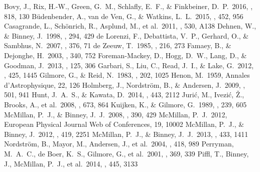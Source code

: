 \documentclass[iop,revtex4]{emulateapj}
\begin{document}
\begin{thebibliography}{}
 Bovy, J., Rix, H.-W., 
Green, G.~M., Schlafly, E.~F., \& Finkbeiner, D.~P.\ 2016, \apj, 818, 130 
 B{\"u}denbender, A., van de Ven, G., \& Watkins, L.~L.\ 2015, \mnras, 452, 956 
 Casagrande, L., Sch{\"o}nrich, R., Asplund, M., et al.\ 2011, \aap, 530, A138 
 Dehnen, W., \& Binney, J.\ 1998, \mnras, 294, 429 
 de Lorenzi, F., Debattista, V.~P., Gerhard, O., \& Sambhus, N.\ 2007, \mnras, 376, 71 
 de Zeeuw, T.\ 1985, \mnras, 216, 273 
 Famaey, B., \& Dejonghe, H.\ 2003, \mnras, 340, 752 
 Foreman-Mackey, D., Hogg, D.~W., Lang, D., \& Goodman, J.\ 2013, \pasp, 125, 306
 Garbari, S., Liu, C., Read, J.~I., \& Lake, G.\ 2012, \mnras, 425, 1445 
 Gilmore, G., \& Reid, N.\ 1983, \mnras, 202, 1025 
 Henon, M.\ 1959, Annales d'Astrophysique, 22, 126 
 Holmberg, J., Nordstr{\"o}m, B., \& Andersen, J.\ 2009, \aap, 501, 941 
 Hunt, J.~A.~S., \& Kawata, D.\ 2014, \mnras, 443, 2112 
 Juri{\'c}, M., Ivezi{\'c}, {\v Z}., Brooks, A., et al.\ 2008, \apj, 673, 864
 Kuijken, K., \& Gilmore, G.\ 1989, \mnras, 239, 605 
 McMillan, P.~J., \& Binney, J.~J.\ 2008, \mnras, 390, 429 
 McMillan, P.~J.\ 2012, European Physical Journal Web of Conferences, 19, 10002 
 McMillan, P.~J., \& Binney, J.\ 2012, \mnras, 419, 2251 
 McMillan, P.~J., \& Binney, J.~J.\ 2013, \mnras, 433, 1411
 Nordstr{\"o}m, B., Mayor, M., Andersen, J., et al.\ 2004, \aap, 418, 989 
 Perryman, M.~A.~C., de Boer, K.~S., Gilmore, G., et al.\ 2001, \aap, 369, 339 
 Piffl, T., Binney, J., McMillan, P.~J., et al.\ 2014, \mnras, 445, 3133

\end{thebibliography}
\end{document}
